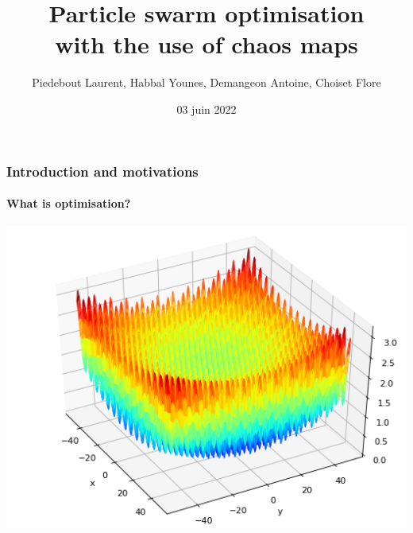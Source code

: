 \documentclass{beamer}
\title{\color{velvet}
	Particle swarm optimisation\\with the use of chaos maps
	}
\author{
Piedebout Laurent,
Habbal Younes,
Demangeon Antoine,
Choiset Flore
}
\date{03 juin 2022}
\begin{document}
	\begin{frame}
	\titlepage
	\end{frame}


	\begin{frame}
	\frametitle{\color{velvet} Introduction and motivations}
	\framesubtitle{What is optimisation?}
		\begin{center}
		\includegraphics[scale=0.45]{optimisation.png}
		\end{center}
	\end{frame}
\end{document}
